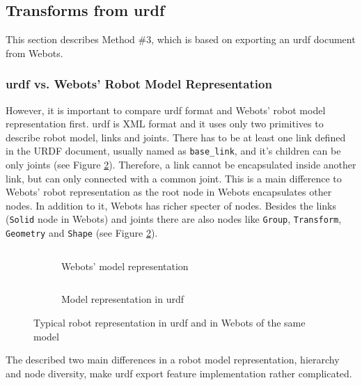\subsection{Transforms from \acs{urdf}}
This section describes Method \#3, which is based on exporting an \ac{urdf} document from Webots. 

\subsubsection{\acs{urdf} vs. Webots' Robot Model Representation}
However, it is important to compare \ac{urdf} format and Webots' robot model representation first.
\ac{urdf} is XML format and it uses only two primitives to describe robot model, links and joints.
There has to be at least one link defined in the URDF document, usually named as \texttt{base\_link}, and it's children can be only joints \cite{noauthor_urdf_nodate} (see Figure \ref{fig:generalization:urdf_vs_webots:urdf}).
Therefore, a link cannot be encapsulated inside another link, but can only connected with a common joint.
This is a main difference to Webots' robot representation as the root node in Webots encapsulates other nodes.
In addition to it, Webots has richer specter of nodes.
Besides the links (\texttt{Solid} node in Webots) and joints there are also nodes like \texttt{Group}, \texttt{Transform}, \texttt{Geometry} and \texttt{Shape} (see Figure \ref{fig:generalization:urdf_vs_webots:urdf}).

\begin{figure}[H]
\centering
\begin{subfigure}{.5\textwidth}
  \centering
  \inputminted{c}{generalization/data/simple.proto}
  \caption{Webots' model representation}
  \label{fig:generalization:urdf_vs_webots:webots}
\end{subfigure}%
\begin{subfigure}{.5\textwidth}
  \centering
  \inputminted[fontsize=\footnotesize]{xml}{generalization/data/simple.urdf}
  \caption{Model representation in \ac{urdf}}
  \label{fig:generalization:urdf_vs_webots:urdf}
\end{subfigure}
\caption{Typical robot representation in \ac{urdf} and in Webots of the same model}
\label{fig:generalization:urdf_vs_webots}
\end{figure}

The described two main differences in a robot model representation, hierarchy and node diversity, make \ac{urdf} export feature implementation rather complicated. 

